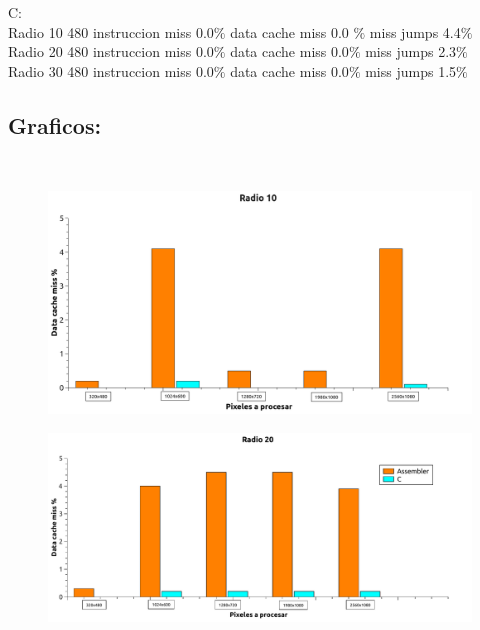 C:\\
	Radio 10 480  	instruccion miss  0.0$\%$ data cache miss 0.0 $\%$ miss jumps  4.4$\%$ \\
	Radio 20 480  	instruccion miss  0.0$\%$ data cache miss 0.0$\%$ miss jumps 2.3$\%$ \\
	Radio 30 480  	instruccion miss  0.0$\%$ data cache miss 0.0$\%$ miss jumps  1.5$\%$ \\

\subsection{Graficos:} \\


\begin{figure}[H]
\begin{center}
  \includegraphics[width=\linewidth]{cache/Radio 10.png}
\end{center}
\end{figure}

\begin{figure}[H]
\begin{center}
  \includegraphics[width=\linewidth]{cache/Radio 20.pdf}
\end{center}
\end{figure}

